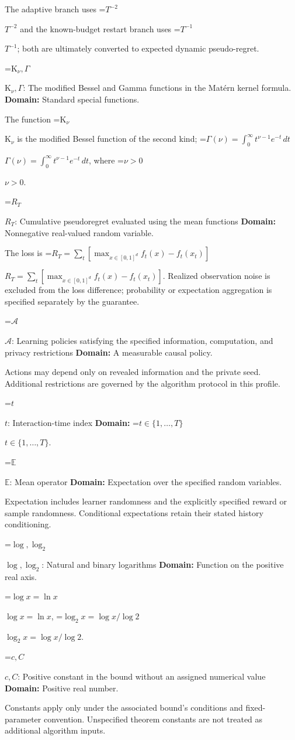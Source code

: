 \documentclass[10pt,a4paper]{article}
\newcommand{\AtlasMath}[1]{\par\begingroup\centering\setbox0=\hbox{$\displaystyle #1$}\ifdim\wd0>1.4\linewidth\typeout{ATLAS WIDE FORMULA: \the\wd0}\fi\ifdim\wd0>\linewidth\resizebox{\linewidth}{!}{\box0}\else\box0\fi\par\endgroup}
\newcommand{\AtlasInlineMath}[1]{\begingroup\setbox0=\hbox{$#1$}\ifdim\wd0>.4\linewidth\endgroup\AtlasMath{#1}\else\endgroup$#1$\fi}
\begin{document}
The adaptive branch uses \AtlasInlineMath{T^{-2}} and the known-budget restart branch uses \AtlasInlineMath{T^{-1}}; both are ultimately converted to expected dynamic pseudo-regret.

\AtlasInlineMath{\mathrm K_\nu,\Gamma}: The modified Bessel and Gamma functions in the Matérn kernel formula. \textbf{Domain:} Standard special functions.

The function \AtlasInlineMath{\mathrm K_\nu} is the modified Bessel function of the second kind; \AtlasInlineMath{\Gamma(\nu)=\int_0^\infty t^{\nu-1}e^{-t}\,dt}, where \AtlasInlineMath{\nu>0}.

\AtlasInlineMath{R_T}: Cumulative pseudoregret evaluated using the mean functions \textbf{Domain:} Nonnegative real-valued random variable.

The loss is \AtlasInlineMath{R_T=\sum_t[\max_{x\in[0,1]^d}f_t(x)-f_t(x_t)]}. Realized observation noise is excluded from the loss difference; probability or expectation aggregation is specified separately by the guarantee.

\AtlasInlineMath{\mathcal A}: Learning policies satisfying the specified information, computation, and privacy restrictions \textbf{Domain:} A measurable causal policy.

Actions may depend only on revealed information and the private seed. Additional restrictions are governed by the algorithm protocol in this profile.

\AtlasInlineMath{t}: Interaction-time index \textbf{Domain:} \AtlasInlineMath{t\in\{1,\ldots,T\}}.

\AtlasInlineMath{\mathbb E}: Mean operator \textbf{Domain:} Expectation over the specified random variables.

Expectation includes learner randomness and the explicitly specified reward or sample randomness. Conditional expectations retain their stated history conditioning.

\AtlasInlineMath{\log,\log_2}: Natural and binary logarithms \textbf{Domain:} Function on the positive real axis.

\AtlasInlineMath{\log x=\ln x}, \AtlasInlineMath{\log_2x=\log x/\log2}.

\AtlasInlineMath{c,C}: Positive constant in the bound without an assigned numerical value \textbf{Domain:} Positive real number.

Constants apply only under the associated bound’s conditions and fixed-parameter convention. Unspecified theorem constants are not treated as additional algorithm inputs.
\end{document}
